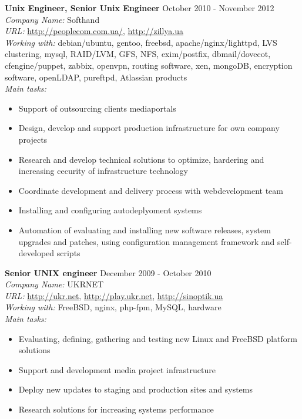 \documentclass[mymargin,10pt]{res} %
\begin{document}
\begin{resume}
{\bf Unix Engineer, Senior Unix Engineer} \hfill October 2010 - November 2012 \\
{\sl Company Name:} Softhand \\
{\sl URL:} \url{http://peoplecom.com.ua/}, \url{http://zillya.ua}\\
{\sl Working with:} debian/ubuntu, gentoo, freebsd, apache/nginx/lighttpd, LVS clustering, mysql,
RAID/LVM, GFS, NFS, exim/postfix, dbmail/dovecot, cfengine/puppet, zabbix, openvpn, routing software,
xen, mongoDB, encryption software, openLDAP, pureftpd, Atlassian products \\
{\sl Main tasks:}
\begin{itemize}
\item Support of outsourcing clients mediaportals
\item Design, develop and support production infrastructure for own company projects
\item Research and develop technical solutions to optimize, hardering and increasing cecurity of infrastructure technology
\item Coordinate development and delivery process with webdevelopment team
\item Installing and configuring autodeplyoment systems
\item Automation of evaluating and installing new software releases, system upgrades and patches,
  using configuration management framework and self-developed scripts
\end{itemize}

{\bf Senior UNIX engineer} \hfill December 2009 - October 2010 \\
{\sl Company Name:} UKRNET \\
{\sl URL:} \url{http://ukr.net}, \url{http://play.ukr.net}, \url{http://sinoptik.ua} \\
{\sl Working with:} FreeBSD, nginx, php-fpm, MySQL, hardware \\
{\sl Main tasks:}
\begin{itemize}
\item Evaluating, defining, gathering and testing new Linux and FreeBSD platform solutions
\item Support and development media project infrastructure
\item Deploy new updates to staging and production sites and systems
\item Research solutions for increasing systems performance
\end{itemize}


\end{resume}
\end{document}
